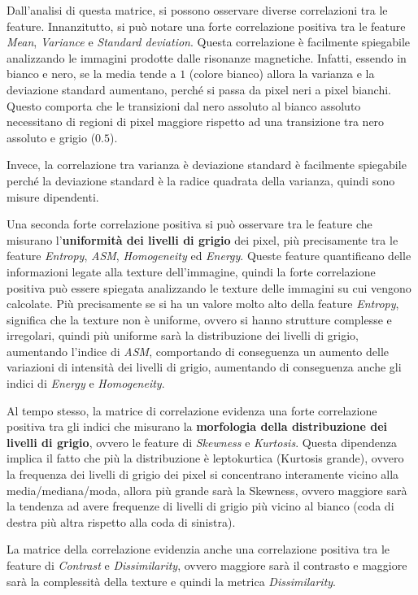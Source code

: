 Dall'analisi di questa matrice, si possono osservare diverse correlazioni tra le
feature. Innanzitutto, si può notare una forte correlazione positiva tra le feature
\textit{Mean}, \textit{Variance} e \textit{Standard deviation}. Questa correlazione
è facilmente spiegabile analizzando le immagini prodotte dalle risonanze magnetiche.
Infatti, essendo in bianco e nero, se la media tende a $1$ (colore bianco) allora
la varianza e la deviazione standard aumentano, perché si passa da pixel neri a 
pixel bianchi. Questo comporta che le transizioni dal nero assoluto al bianco
assoluto necessitano di regioni di pixel maggiore rispetto ad una transizione
tra nero assoluto e grigio ($0.5$).

Invece, la correlazione tra varianza è deviazione standard è facilmente spiegabile
perché la deviazione standard è la radice quadrata della varianza, quindi sono
misure dipendenti.

Una seconda forte correlazione positiva si può osservare tra le feature che
misurano l'\textbf{uniformità dei livelli di grigio} dei pixel, più precisamente
tra le feature \textit{Entropy}, \textit{ASM}, \textit{Homogeneity} ed
\textit{Energy}. Queste feature quantificano delle informazioni legate alla
texture dell'immagine, quindi la forte correlazione positiva può essere spiegata
analizzando le texture delle immagini su cui vengono calcolate. Più precisamente
se si ha un valore molto alto della feature \textit{Entropy}, significa che la
texture non è uniforme, ovvero si hanno strutture complesse e irregolari, quindi
più uniforme sarà la distribuzione dei livelli di grigio, aumentando l'indice
di \textit{ASM}, comportando di conseguenza un aumento delle variazioni di intensità
dei livelli di grigio, aumentando di conseguenza anche gli indici di \textit{Energy}
e \textit{Homogeneity}. 

Al tempo stesso, la matrice di correlazione evidenza una forte correlazione positiva
tra gli indici che misurano la \textbf{morfologia della distribuzione dei livelli
      di grigio}, ovvero le feature di \textit{Skewness} e \textit{Kurtosis}.
Questa dipendenza implica il fatto che più la distribuzione è leptokurtica
(Kurtosis grande), ovvero la frequenza dei livelli di grigio dei pixel si
concentrano interamente vicino alla media/mediana/moda, allora più grande sarà
la Skewness, ovvero maggiore sarà la tendenza ad avere frequenze di livelli di
grigio più vicino al bianco (coda di destra più altra rispetto alla coda di
sinistra).

La matrice della correlazione evidenzia anche una correlazione positiva tra le
feature di \textit{Contrast} e \textit{Dissimilarity}, ovvero maggiore sarà il
contrasto e maggiore sarà la complessità della texture e quindi la metrica 
\textit{Dissimilarity}.

